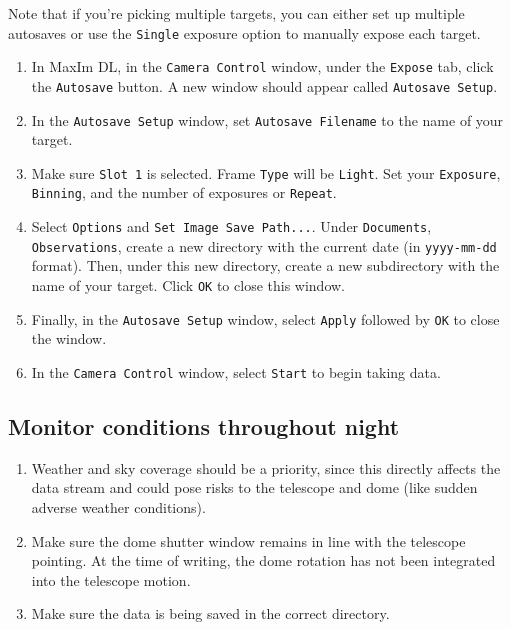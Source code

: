\documentclass{article}
\begin{document}
		Note that if you're picking multiple targets, you can either set up multiple autosaves or use the \texttt{Single} exposure option to manually expose each target.
		
		\begin{enumerate}
			
			\item In MaxIm DL, in the \texttt{Camera Control} window, under the \texttt{Expose} tab, click the \texttt{Autosave} button. A new window should appear called \texttt{Autosave Setup}.
			
			\item In the \texttt{Autosave Setup} window, set \texttt{Autosave Filename} to the name of your target.
			
			\item Make sure \texttt{Slot 1} is selected. Frame \texttt{Type} will be \texttt{Light}. Set your \texttt{Exposure}, \texttt{Binning}, and the number of exposures or \texttt{Repeat}.
			
			\item Select \texttt{Options} and \texttt{Set Image Save Path...}. Under \texttt{Documents}, \texttt{Observations}, create a new directory with the current date (in \texttt{yyyy-mm-dd} format). Then, under this new directory, create a new subdirectory with the name of your target. Click \texttt{OK} to close this window.
			
			\item Finally, in the \texttt{Autosave Setup} window, select \texttt{Apply} followed by \texttt{OK} to close the window.
			
			\item In the \texttt{Camera Control} window, select \texttt{Start} to begin taking data.
			
		\end{enumerate}
		
	\subsection{Monitor conditions throughout night}
		
		\begin{enumerate}
			
			\item Weather and sky coverage should be a priority, since this directly affects the data stream and could pose risks to the telescope and dome (like sudden adverse weather conditions).
			
			\item Make sure the dome shutter window remains in line with the telescope pointing. At the time of writing, the dome rotation has not been integrated into the telescope motion.
			
			\item Make sure the data is being saved in the correct directory.
			
		\end{enumerate}
		
\end{document}
